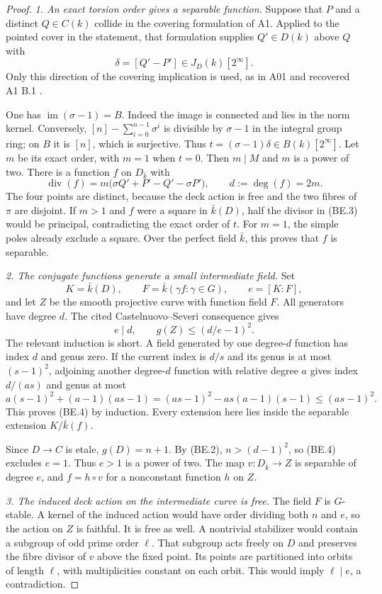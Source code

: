 \begin{proof}
\emph{1. An exact torsion order gives a separable function.}
Suppose that $P$ and a distinct $Q\in C(k)$ collide in the
covering formulation of A1. Applied to the pointed cover in the
statement, that formulation supplies $Q'\in D(k)$ above $Q$ with
\[
                    \delta=[Q'-P']\in J_D(k)[2^\infty].
\]
Only this direction of the covering implication is used, as in
A01 and recovered A1 B.1 \cite[B.1]{A1run}.

One has $\operatorname{im}(\sigma-1)=B$.
Indeed the image is connected and lies in the norm kernel.
Conversely, $[n]-\sum_{i=0}^{n-1}\sigma^i$ is divisible by
$\sigma-1$ in the integral group ring; on $B$ it is $[n]$,
which is surjective. Thus
$t=(\sigma-1)\delta\in B(k)[2^\infty]$.
Let $m$ be its exact order, with $m=1$ when $t=0$.
Then $m\mid M$ and $m$ is a power of two. There is a function
$f$ on $D_{\bar k}$ with
\[
 \operatorname{div}(f)
       =m\bigl(\sigma Q'+P'-Q'-\sigma P'\bigr),
                  \qquad d:=\deg(f)=2m.
 \tag{BE.3}
\]
The four points are distinct, because the deck action is free
and the two fibres of $\pi$ are disjoint. If $m>1$ and $f$ were
a square in $\bar k(D)$, half the divisor in (BE.3) would be
principal, contradicting the exact order of $t$. For $m=1$,
the simple poles already exclude a square. Over the perfect
field $\bar k$, this proves that $f$ is separable.

\emph{2. The conjugate functions generate a small intermediate field.}
Set
\[
 K=\bar k(D),\qquad F=\bar k(\gamma f:\gamma\in G),
       \qquad e=[K:F],
\]
and let $Z$ be the smooth projective curve with function field $F$.
All generators have degree $d$. The cited Castelnuovo--Severi
consequence gives
\[
                 e\mid d,\qquad g(Z)\le(d/e-1)^2.
 \tag{BE.4}
\]
The relevant induction is short. A field generated by one
degree-$d$ function has index $d$ and genus zero. If the
current index is $d/s$ and its genus is at most $(s-1)^2$,
adjoining another degree-$d$ function with relative degree $a$
gives index $d/(as)$ and genus at most
\[
 a(s-1)^2+(a-1)(as-1)
       =(as-1)^2-as(a-1)(s-1)\le(as-1)^2.
\]
This proves (BE.4) by induction. Every extension here lies
inside the separable extension $K/\bar k(f)$.

Since $D\to C$ is etale, $g(D)=n+1$.
By (BE.2), $n>(d-1)^2$, so (BE.4) excludes $e=1$.
Thus $e>1$ is a power of two. The map $v:D_{\bar k}\to Z$
is separable of degree $e$, and $f=h\circ v$ for a nonconstant
function $h$ on $Z$.

\emph{3. The induced deck action on the intermediate curve is free.}
The field $F$ is $G$-stable. A kernel of the induced action
would have order dividing both $n$ and $e$, so the action on
$Z$ is faithful. It is free as well. A nontrivial stabilizer
would contain a subgroup of odd prime order $\ell$. That
subgroup acts freely on $D$ and preserves the fibre divisor
of $v$ above the fixed point. Its points are partitioned into
orbits of length $\ell$, with multiplicities constant on each
orbit. This would imply $\ell\mid e$, a contradiction.


\end{proof}
